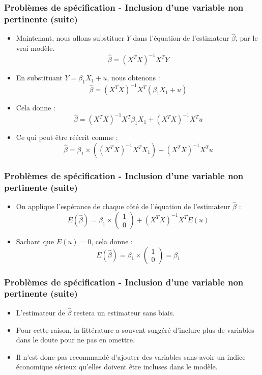 \documentclass{beamer}
\begin{document}
\begin{frame}
\frametitle{Problèmes de spécification - Inclusion d’une variable non pertinente (suite)}
\begin{itemize}
    \item Maintenant, nous allons substituer \( Y \) dans l’équation de l’estimateur \( \hat{\beta} \), par le vrai modèle.
    \[
    \hat{\beta} = (X^T X)^{-1} X^T Y
    \]
    \item En substituant \( Y = \beta_1 X_1 + u \), nous obtenons :
    \[
    \hat{\beta} = (X^T X)^{-1} X^T \left( \beta_1 X_1 + u \right)
    \]
    \item Cela donne :
    \[
    \hat{\beta} = (X^T X)^{-1} X^T \beta_1 X_1 + (X^T X)^{-1} X^T u
    \]
    \item Ce qui peut être réécrit comme :
    \[
    \hat{\beta} = \beta_1 \times \left( (X^T X)^{-1} X^T X_1 \right) + (X^T X)^{-1} X^T u
    \]
\end{itemize}
\end{frame}


\begin{frame}
\frametitle{Problèmes de spécification - Inclusion d’une variable non pertinente (suite)}
\begin{itemize}
    \item On applique l'espérance de chaque côté de l'équation de l'estimateur \( \hat{\beta} \) :
    \[
    E(\hat{\beta}) = \beta_1 \times \begin{pmatrix} 1 \\ 0 \end{pmatrix} + (X^T X)^{-1} X^T E(u)
    \]
    \item Sachant que \( E(u) = 0 \), cela donne :
    \[
    E(\hat{\beta}) = \beta_1 \times \begin{pmatrix} 1 \\ 0 \end{pmatrix} = \beta_1
    \]
\end{itemize}
\end{frame}


\begin{frame}
\frametitle{Problèmes de spécification - Inclusion d’une variable non pertinente (suite)}
\begin{itemize}
    \item L'estimateur de \( \hat{\beta} \) restera un estimateur sans biais.
    \item Pour cette raison, la littérature a souvent suggéré d'inclure plus de variables dans le doute pour ne pas en omettre.
    \item Il n'est donc pas recommandé d'ajouter des variables sans avoir un indice économique sérieux qu'elles doivent être incluses dans le modèle.
\end{itemize}
\end{frame}
\end{document}
